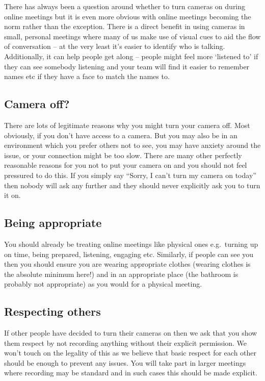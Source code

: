 \documentclass[
]{book}
\begin{document}
There has always been a question around whether to turn cameras on during online meetings but it is even more obvious with online meetings becoming the norm rather than the exception. There is a direct benefit in using cameras in small, personal meetings where many of us make use of visual cues to aid the flow of conversation -- at the very least it's easier to identify who is talking. Additionally, it can help people get along -- people might feel more `listened to' if they can see somebody listening and your team will find it easier to remember names etc if they have a face to match the names to.

\hypertarget{off}{%
\subsection{Camera off?}\label{off}}

There are lots of legitimate reasons why you might turn your camera off. Most obviously, if you don't have access to a camera. But you may also be in an environment which you prefer others not to see, you may have anxiety around the issue, or your connection might be too slow. There are many other perfectly reasonable reasons for you not to put your camera on and you should not feel pressured to do this. If you simply say ``Sorry, I can't turn my camera on today'' then nobody will ask any further and they should never explicitly ask you to turn it on.

\hypertarget{being}{%
\subsection{Being appropriate}\label{being}}

You should already be treating online meetings like physical ones e.g.~turning up on time, being prepared, listening, engaging etc. Similarly, if people can see you then you should ensure you are wearing appropriate clothes (wearing clothes is the absolute minimum here!) and in an appropriate place (the bathroom is probably not appropriate) as you would for a physical meeting.

\hypertarget{respecting}{%
\subsection{Respecting others}\label{respecting}}

If other people have decided to turn their cameras on then we ask that you show them respect by not recording anything without their explicit permission. We won't touch on the legality of this as we believe that basic respect for each other should be enough to prevent any issues. You will take part in larger meetings where recording may be standard and in such cases this should be made explicit.
\end{document}
